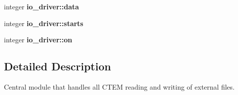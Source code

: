 \begin{DoxyCompactItemize}
\item 
\hypertarget{namespaceio__driver_ad56323d90fc742e3b67df8313e50f5ac}{}integer {\bfseries io\+\_\+driver\+::data}\label{namespaceio__driver_ad56323d90fc742e3b67df8313e50f5ac}

\item 
\hypertarget{namespaceio__driver_a56032ba5fa5bf083b686b5ec2a0c7172}{}integer {\bfseries io\+\_\+driver\+::starts}\label{namespaceio__driver_a56032ba5fa5bf083b686b5ec2a0c7172}

\item 
\hypertarget{namespaceio__driver_aa7c14131a3e022204d6162fc91d1e125}{}integer {\bfseries io\+\_\+driver\+::on}\label{namespaceio__driver_aa7c14131a3e022204d6162fc91d1e125}

\end{DoxyCompactItemize}


\subsection{Detailed Description}
Central module that handles all C\+T\+E\+M reading and writing of external files. 

